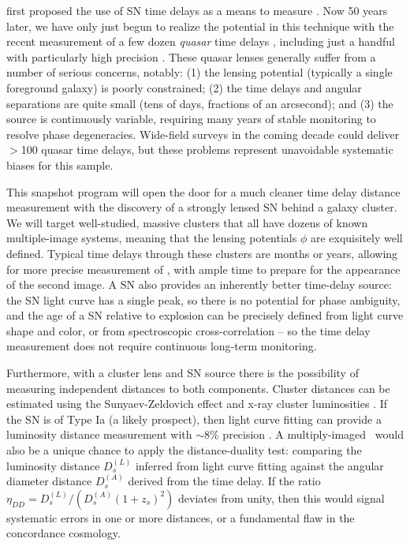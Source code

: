 \citep{Refsdal:1964} first proposed the use of SN time delays as 
a means to measure \Ho.  Now 50 years later, we have only just begun
to realize the potential in this technique with the recent
measurement of a few dozen {\it quasar} time
delays \citep{Jackson:2007}, including just a handful with
particularly high precision \citep{Suyu:2010,Suyu:2013}.  These quasar
lenses generally suffer from a number of serious concerns, notably:
(1) the lensing potential (typically a single foreground galaxy) is
poorly constrained; (2) the time delays and angular separations are
quite small (tens of days, fractions of an arcsecond); and (3) the
source is continuously variable, requiring many years of stable
monitoring to resolve phase degeneracies.  Wide-field surveys in the
coming decade could deliver $>$100 quasar time delays, but these
problems represent unavoidable systematic biases for this sample.
 

This snapshot program will open the door for a much cleaner time delay
distance measurement with the discovery of a strongly lensed SN behind
a galaxy cluster.  We will target well-studied, massive clusters that
all have dozens of known multiple-image systems, meaning that the
lensing potentials $\phi$ are exquisitely well defined.  Typical time
delays through these clusters are months or years, allowing for more
precise measurement of \dt, with ample time to prepare for the
appearance of the second image.   A SN also provides
an inherently better time-delay source: the SN light curve has a
single peak, so there is no potential for phase ambiguity, and the age
of a SN relative to explosion can be precisely defined from light
curve shape and color, or from spectroscopic
cross-correlation \citep{Filippenko:1997,Blondin:2007} -- so the time
delay measurement does not require continuous long-term monitoring.  

Furthermore, with a cluster lens and SN source there is the
possibility of measuring independent distances to both components.
Cluster distances can be estimated using the Sunyaev-Zeldovich effect
and x-ray cluster luminosities \citep{Silk:1978}.  If the SN is of
Type Ia (a likely prospect), then light curve fitting can provide a
luminosity distance measurement with $\sim$8\%
precision \citep{Phillips:1993}.  A multiply-imaged \SNIa\ would also
be a unique chance to apply the distance-duality test: comparing the
luminosity distance $D_{s}^{(L)}$ inferred from light curve fitting
against the angular diameter distance $D_{s}^{(A)}$ derived from the
time delay.  If the ratio
$\eta_{DD} = D_{s}^{(L)} / ( D_{s}^{(A)}(1+z_s)^2 )$
deviates from unity, then this would signal systematic errors in one or
more distances, or a fundamental flaw in the concordance cosmology. 



